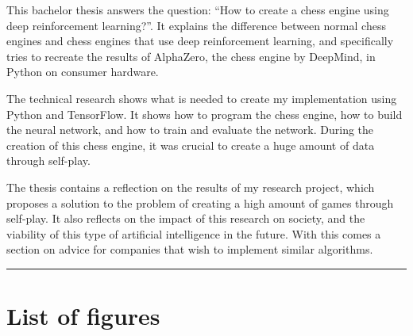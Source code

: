 \documentclass{article}
\makeatletter
\renewcommand\tableofcontents{%
  \null\hfill\textbf{\Huge\contentsname}\hfill\null\par
  \vline\noexpand\rule{\textwidth}{1pt}%
  \@mkboth{\MakeUppercase\contentsname}{\MakeUppercase\contentsname}%
  \@starttoc{toc}%
}
\makeatother
\begin{document}


This bachelor thesis answers the question: ``How to create a chess engine using deep reinforcement learning?''.
It explains the difference between normal chess engines and chess engines that use deep reinforcement learning, and
specifically tries to recreate the results of AlphaZero, the chess engine by DeepMind, in Python on consumer hardware. 

The technical research shows what is needed to create my implementation using Python and TensorFlow. 
It shows how to program the chess engine, how to build the neural network, and how to train and evaluate the network.
During the creation of this chess engine, it was crucial to create a huge amount of data through self-play.

The thesis contains a reflection on the results of my research project, which proposes a solution to the problem of
creating a high amount of games through self-play. It also reflects on the impact of this research on society, and the
viability of this type of artificial intelligence in the future. With this comes a section on advice for companies that wish
to implement similar algorithms.



\newpage
\thispagestyle{empty}
\mbox{}
\newpage

\tableofcontents
\newpage

\section*{List of figures}
\renewcommand{\listfigurename}{}
\listoffigures
\newpage

\end{document}
